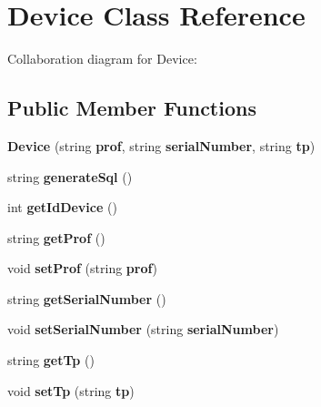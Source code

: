 \section{Device Class Reference}
\label{classbr_1_1ufscar_1_1lince_1_1ginga_1_1recommender_1_1Device}
Collaboration diagram for Device:\subsection*{Public Member Functions}
\begin{CompactItemize}
\item 
\textbf{Device} (string {\bf prof}, string {\bf serialNumber}, string {\bf tp})\label{classbr_1_1ufscar_1_1lince_1_1ginga_1_1recommender_1_1Device_cc336aaa1c824c44d3edd27d58a8be6f}

\item 
string \textbf{generateSql} ()\label{classbr_1_1ufscar_1_1lince_1_1ginga_1_1recommender_1_1Device_8f1e45f781da9a5727416350efd7d586}

\item 
int \textbf{getIdDevice} ()\label{classbr_1_1ufscar_1_1lince_1_1ginga_1_1recommender_1_1Device_0bb84b81477c4b901ef996565ca9198f}

\item 
string \textbf{getProf} ()\label{classbr_1_1ufscar_1_1lince_1_1ginga_1_1recommender_1_1Device_d7fb36a7e8cfc9906a709c10594c7c46}

\item 
void \textbf{setProf} (string {\bf prof})\label{classbr_1_1ufscar_1_1lince_1_1ginga_1_1recommender_1_1Device_0c517afea1758589898f6409eaa513a1}

\item 
string \textbf{getSerialNumber} ()\label{classbr_1_1ufscar_1_1lince_1_1ginga_1_1recommender_1_1Device_138d556a349e7ee4fdeb968490d89592}

\item 
void \textbf{setSerialNumber} (string {\bf serialNumber})\label{classbr_1_1ufscar_1_1lince_1_1ginga_1_1recommender_1_1Device_0898607edfe31f74d6a34811a7663938}

\item 
string \textbf{getTp} ()\label{classbr_1_1ufscar_1_1lince_1_1ginga_1_1recommender_1_1Device_77b9a79010ca243e431e3ed352332f44}

\item 
void \textbf{setTp} (string {\bf tp})\label{classbr_1_1ufscar_1_1lince_1_1ginga_1_1recommender_1_1Device_25ca68bbf258f1f700d8ff0732e69a95}

\end{CompactItemize}
